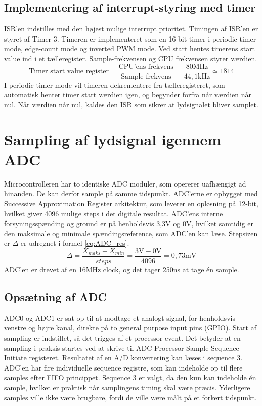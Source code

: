 \subsection{Implementering af interrupt-styring med timer}
\label{subsec:impl_int}
ISR'en indstilles med den højest mulige interrupt prioritet. 
Timingen af ISR'en er styret af Timer 3. 
Timeren er implementeret som en 16-bit timer i periodic timer mode, edge-count mode og inverted PWM mode.
Ved start hentes timerens start value ind i et tælleregister. 
Sample-frekvensen og CPU frekvensen styrer værdien. 
\begin{equation}
	\text{Timer start value register} = \frac{\text{CPU'ens frekvens}}{\text{Sample-frekvens}} = \frac{80\text{MHz}}{44,1\text{kHz}} \simeq 1814
\end{equation}
I periodic timer mode vil timeren dekrementere fra tælleregisteret, som automatisk henter timer start værdien igen, og begynder forfra når værdien når nul. 
Når værdien når nul, kaldes den ISR som sikrer at lydsignalet bliver samplet. \newline

\section{Sampling af lydsignal igennem ADC}
Microcontrolleren har to identiske ADC moduler, som opererer uafhængigt ad hinanden. 
De kan derfor sample på samme tidspunkt. 
ADC'erne er opbygget med Successive Approximation Register arkitektur, som leverer en opløsning på 12-bit, hvilket giver 4096 mulige steps i det digitale resultat. 
ADC'ens interne forsyningsspænding og ground er på henholdsvis 3,3V og 0V, hvilket samtidig er den maksimale og minimale spændingsreference, som ADC'en kan læse. 
Stepsizen er $\Delta$ er udregnet i formel \ref{eq:ADC_res}.
\begin{equation}
\label{eq:ADC_res}
	\Delta = \frac{X_{maks}-X_{min}}{steps} = \frac{3\text{V}-0\text{V}}{4096} = 0,73\text{mV}
\end{equation}
ADC'en er drevet af en 16MHz clock, og det tager 250ns at tage én sample. 

\subsection{Opsætning af ADC}
ADC0 og ADC1 er sat op til at modtage et analogt signal, for henholdsvis venstre og højre kanal, direkte på to general purpose input pins (GPIO). 
Start af sampling er indstillet, så det trigges af et processor event. 
Det betyder at en sampling i praksis startes ved at skrive til ADC Processor Sample Sequence Initiate registeret. 
Resultatet af en A/D konvertering kan læses i sequence 3. 
ADC'en har fire individuelle sequence registre, som kan indeholde op til flere samples efter FIFO princippet. 
Sequence 3 er valgt, da den kun kan indeholde én sample, hvilket er praktisk når samplingens timing skal være præcis. 
Yderligere samples ville ikke være brugbare, fordi de ville være målt på et forkert tidspunkt. 

